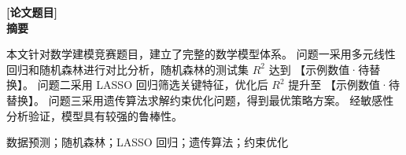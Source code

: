 \begin{center}
  {\fontsize{14pt}{16.8pt}\bfseries [论文题目]}\\[0.65em]
  {\fontsize{14pt}{16.8pt}\bfseries 摘\quad 要}
\end{center}

本文针对数学建模竞赛题目，建立了完整的数学模型体系。
问题一采用多元线性回归和随机森林进行对比分析，随机森林的测试集 $R^2$ 达到 【示例数值·待替换】。
问题二采用 LASSO 回归筛选关键特征，优化后 $R^2$ 提升至 【示例数值·待替换】。
问题三采用遗传算法求解约束优化问题，得到最优策略方案。
经敏感性分析验证，模型具有较强的鲁棒性。

\vspace{0.6em}

数据预测；随机森林；LASSO 回归；遗传算法；约束优化

\newpage
